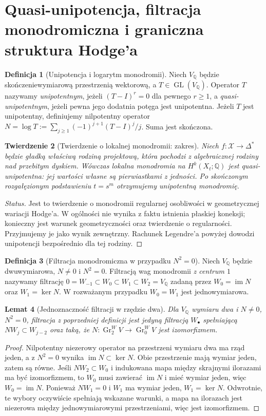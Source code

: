 \documentclass[11pt,a4paper,oneside]{report}
\newcommand{\Q}{\mathbb{Q}}
\theoremstyle{plain}
\newtheorem{twierdzenie}{Twierdzenie}[section]
\newtheorem{lemat}[twierdzenie]{Lemat}
\theoremstyle{definition}
\newtheorem{definicja}[twierdzenie]{Definicja}
\theoremstyle{remark}
\begin{document}
\section{Quasi-unipotencja, filtracja monodromiczna i graniczna struktura Hodge'a}
\begin{definicja}[Unipotencja i logarytm monodromii]
Niech $V_\Q$ będzie skończeniewymiarową przestrzenią
wektorową, a $T\in\operatorname{GL}(V_\Q)$.
Operator $T$ nazywamy \emph{unipotentnym}, jeżeli
$(T-I)^r=0$ dla pewnego $r\ge1$, a \emph{quasi-unipotentnym},
jeżeli pewna jego dodatnia potęga jest unipotentna.
Jeżeli $T$ jest unipotentny, definiujemy nilpotentny
operator $N=\log T:=\sum_{j\ge1}(-1)^{j+1}(T-I)^j/j$.
Suma jest skończona.
\end{definicja}
\begin{twierdzenie}[Twierdzenie o lokalnej monodromii: zakres]
Niech $f:\mathcal X\to\Delta^*$ będzie gładką właściwą
rodziną projektową, która pochodzi z algebraicznej rodziny
nad przebitym dyskiem. Wówczas lokalna monodromia na
$H^k(X_t;\Q)$ jest quasi-unipotentna: jej wartości własne
są pierwiastkami z jedności. Po skończonym rozgałęzionym
podstawieniu $t=s^m$ otrzymujemy unipotentną monodromię.
\end{twierdzenie}
\begin{proof}[Status]
Jest to twierdzenie o monodromii regularnej osobliwości
w geometrycznej wariacji Hodge'a. W ogólności nie wynika
z faktu istnienia płaskiej koneksji; konieczny jest warunek
geometryczności oraz twierdzenie o regularności.
Przyjmujemy je jako wynik zewnętrzny. Rachunek Legendre'a
powyżej dowodzi unipotencji bezpośrednio dla tej rodziny.
\end{proof}

\begin{definicja}[Filtracja monodromiczna w przypadku $N^2=0$]
Niech $V_\Q$ będzie dwuwymiarowa, $N\ne0$ i $N^2=0$.
Filtracją wag monodromii \emph{z centrum $1$} nazywamy
filtrację $0=W_{-1}\subset W_0\subset W_1\subset W_2=V_\Q$
zadaną przez $W_0=\operatorname{im}N$ oraz
$W_1=\ker N$. W rozważanym przypadku
$W_0=W_1$ jest jednowymiarowa.
\end{definicja}
\begin{lemat}[Jednoznaczność filtracji w rzędzie dwa]
\label{lem:xv-weights-rank2}
Dla $V_\Q$ wymiaru dwa i $N\ne0$, $N^2=0$,
filtracja z poprzedniej definicji jest jedyną filtracją
$W_\bullet$ spełniającą $NW_j\subset W_{j-2}$ oraz
taką, że $N:\operatorname{Gr}_2^W V\to
\operatorname{Gr}_0^W V$ jest izomorfizmem.
\end{lemat}
\begin{proof}
Nilpotentny niezerowy operator na przestrzeni
wymiaru dwa ma rząd jeden, a z $N^2=0$ wynika
$\operatorname{im}N\subset\ker N$. Obie przestrzenie
mają wymiar jeden, zatem są równe.
Jeśli $NW_2\subset W_0$ i indukowana mapa między
skrajnymi ilorazami ma być izomorfizmem, to
$W_0$ musi zawierać $\operatorname{im}N$ i mieć wymiar
jeden, więc $W_0=\operatorname{im}N$.
Ponieważ $NW_1=0$ i $W_1$ ma wymiar jeden,
$W_1=\ker N$. Odwrotnie, te wybory oczywiście
spełniają wskazane warunki, a mapa na ilorazach
jest niezerowa między jednowymiarowymi przestrzeniami,
więc jest izomorfizmem.
\end{proof}
\end{document}
